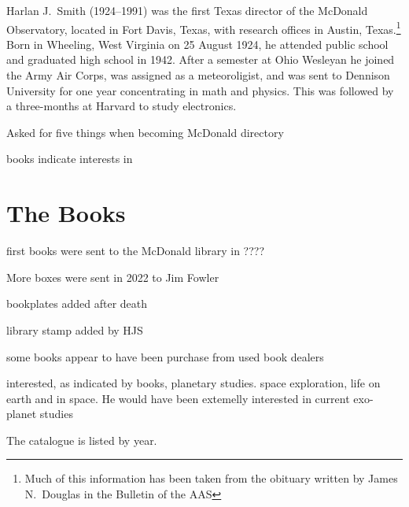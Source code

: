 

Harlan J.~Smith (1924--1991) was the first Texas director of the
McDonald Observatory, located in Fort Davis, Texas, with research
offices in Austin, Texas.\footnote{Much of this information has been
taken from the obituary written by James N.~Douglas in the Bulletin of
the AAS} Born in Wheeling, West Virginia on 25 August
1924, he attended public school and graduated high school in 1942. After
a semester at Ohio Wesleyan he joined the Army Air Corps, was assigned
as a meteoroligist, and was sent to Dennison University for one year
concentrating in math and physics. This was followed by a three-months
at Harvard to study electronics.

Asked for five things when becoming McDonald directory

books indicate interests in

\section*{The Books}

first books were sent to the McDonald library in ????

More boxes were sent in 2022 to Jim Fowler

bookplates added after death

library stamp added by HJS

some books appear to have been purchase from used book dealers

interested, as indicated by books, planetary studies. space
exploration, life on earth and in space. He would have been extemelly
interested in current exo-planet studies

The catalogue is listed by year.
